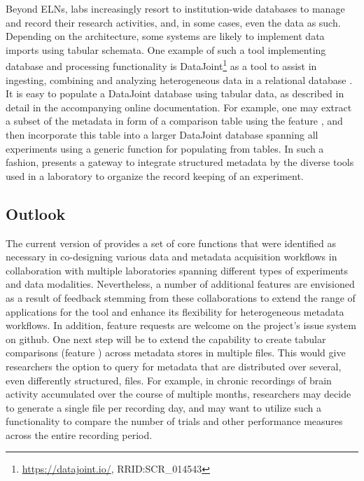 Beyond ELNs, labs increasingly resort to institution-wide databases to manage and record their research activities, and, in some cases, even the data as such. Depending on the architecture, some systems are likely to implement data imports using tabular schemata. One example of such a tool implementing database and processing functionality is DataJoint\footnote{\url{https://datajoint.io/}, RRID:SCR\_014543} as a tool to assist in ingesting, combining and analyzing heterogeneous data in a relational database \citep{Yatsenko_2015}. It is easy to populate a DataJoint database using tabular data, as described in detail in the accompanying online documentation. For example, one may extract a subset of the metadata in form of a comparison table using the  feature \fcompare, and then incorporate this table into a larger DataJoint database spanning all experiments using a generic function for populating from  tables. In such a fashion,  presents a gateway to integrate structured metadata by the diverse tools used in a laboratory to organize the record keeping of an experiment.

\subsection{Outlook}
The current version of  provides a set of core functions that were identified as necessary in co-designing various data and metadata acquisition workflows in collaboration with multiple laboratories spanning different types of experiments and data modalities. Nevertheless, a number of additional features are envisioned as a result of feedback stemming from these collaborations to extend the range of applications for the tool and enhance its flexibility for heterogeneous metadata workflows. In addition, feature requests are welcome on the project's issue system on github. One next step will be to extend the capability to create tabular comparisons (feature \fcompare) across metadata stores in multiple files. This would give researchers the option to query for metadata that are distributed over several, even differently structured,  files. For example, in chronic recordings of brain activity accumulated over the course of multiple months, researchers may decide to generate a single  file per recording day, and may want to utilize such a functionality to compare the number of trials and other performance measures across the entire recording period.

